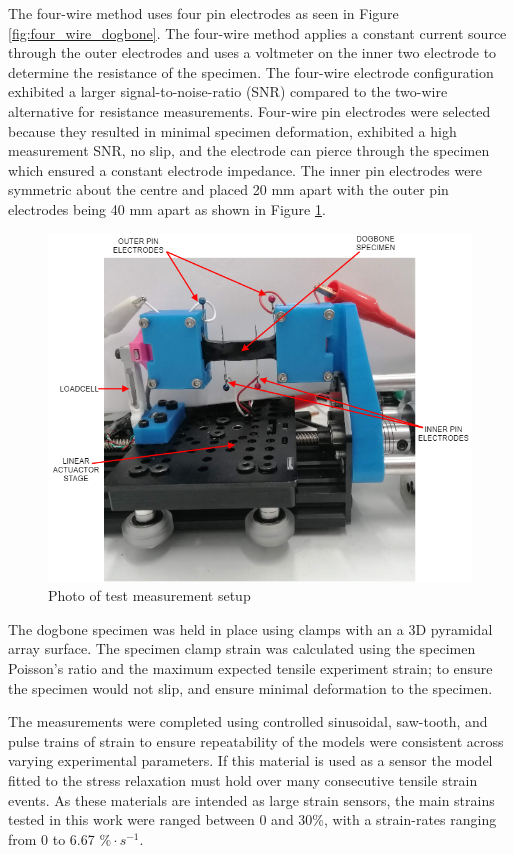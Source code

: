 The four-wire method uses four pin electrodes as seen in Figure \ref{fig:four_wire_dogbone}. The four-wire method applies a constant current source through the outer electrodes and uses a voltmeter on the inner two electrode to determine the resistance of the specimen. The four-wire electrode configuration exhibited a larger signal-to-noise-ratio (SNR) compared to the two-wire alternative for resistance measurements. Four-wire pin electrodes were selected because they resulted in minimal specimen deformation, exhibited a high measurement SNR, no slip, and the electrode can pierce through the specimen which ensured a constant electrode impedance. The inner pin electrodes were symmetric about the centre and placed 20 mm apart with the outer pin electrodes being 40 mm apart as shown in Figure \ref{fig:electromech-setup}.
\begin{figure}[H]
	\centering
	\includegraphics[width=0.7\linewidth]{Figures/ELECTROMECH-SETUP.png}
	\caption{Photo of test measurement setup}
	\label{fig:electromech-setup}
\end{figure}
The dogbone specimen was held in place using clamps with an a 3D pyramidal array surface. 
The specimen clamp strain was calculated using the specimen Poisson's ratio and the maximum expected tensile experiment strain; to ensure the specimen would not slip, and ensure minimal deformation to the specimen.
  
The measurements were completed using controlled sinusoidal, saw-tooth, and pulse trains of strain to ensure repeatability of the models were consistent across varying experimental parameters. If this material is used as a sensor the model fitted to the stress relaxation must hold over many consecutive tensile strain events. As these materials are intended as large strain sensors, the main strains tested in this work were ranged between 0 and 30\%, with a strain-rates ranging from 0 to 6.67 $\% \cdot s^{-1}$.


